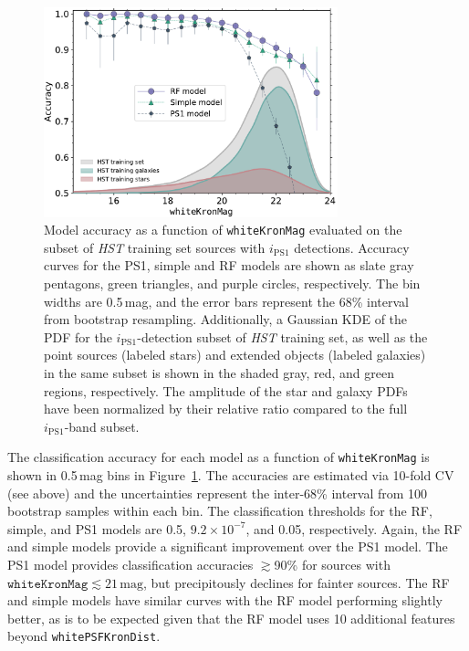 \documentclass[twocolumn, dvipdfmx]{aastex62}
\begin{document}
\begin{CJK*}{UTF8}{gbsn}
\begin{figure}[t]
 \centering
  \includegraphics[width=3.35in]{./Figures/CV_Accuracy_HST.pdf}
  \caption{Model accuracy as a function of \texttt{whiteKronMag} evaluated
  on the subset of \textit{HST} training set sources with $i_\mathrm{PS1}$
  detections. Accuracy curves for the PS1, simple and RF models are shown as
  slate gray pentagons, green triangles, and purple circles, respectively.
  The bin widths are 0.5\,mag, and the error bars represent the 68\%
  interval from bootstrap resampling. Additionally, a Gaussian KDE of the
  PDF for the $i_\mathrm{PS1}$-detection subset of \textit{HST} training
  set, as well as the point sources (labeled stars) and extended objects
  (labeled galaxies) in the same subset is shown in the shaded gray, red,
  and green regions, respectively. The amplitude of the star and galaxy PDFs
  have been normalized by their relative ratio compared to the full
  $i_\mathrm{PS1}$-band subset.} 
  \label{fig:cvacc_hst}
\end{figure}

The classification accuracy for each model as a function of
\texttt{whiteKronMag} is shown in 0.5\,mag bins in
Figure~\ref{fig:cvacc_hst}. The accuracies are estimated via 10-fold CV (see
above) and the uncertainties represent the inter-68\% interval from
100 bootstrap samples within each bin. 
The classification thresholds for the RF, simple, and PS1 models are 0.5,
$9.2 \times 10^{-7}$, and 0.05, respectively. Again, the RF and simple
models provide a significant improvement over the PS1 model. The PS1 model
provides classification accuracies $\gtrsim$90\% for sources with
$\mathtt{whiteKronMag} \lesssim 21\,\mathrm{mag}$, but precipitously
declines for fainter sources. The RF and simple models have similar curves
with the RF model performing slightly better, as is to be expected given
that the RF model uses 10 additional features beyond
\texttt{whitePSFKronDist}.


\end{CJK*}
\end{document}
